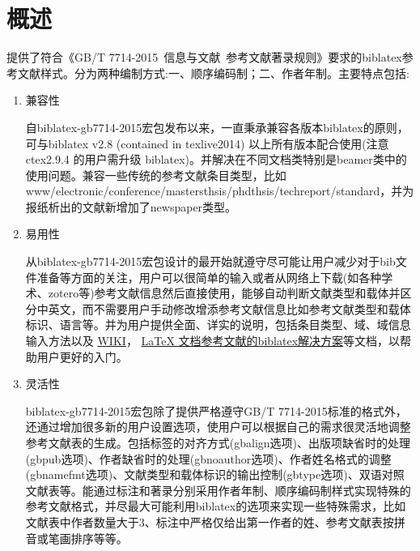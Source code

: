 
\titleandauthor
{}
\tableofcontents
\listoffigures
\listoftables
\listofegcode

\section{概述}
提供了符合《GB/T 7714-2015~信息与文献~参考文献著录规则》要求的biblatex参考文献样式。分为两种编制方式:一、顺序编码制；二、作者年制。主要特点包括:
\begin{enumerate}
  \item 兼容性

自biblatex-gb7714-2015宏包发布以来，一直秉承兼容各版本biblatex的原则，可与biblatex v2.8 (contained in texlive2014) 以上所有版本配合使用(注意 ctex2.9.4 的用户需升级 biblatex)。并解决在不同文档类特别是beamer类中的使用问题。兼容一些传统的参考文献条目类型，比如www/electronic/conference/mastersthsis/phdthsis/techreport/standard，并为报纸析出的文献新增加了newspaper类型。

  \item 易用性

从biblatex-gb7714-2015宏包设计的最开始就遵守尽可能让用户减少对于bib文件准备等方面的关注，用户可以很简单的输入或者从网络上下载(如各种学术、zotero等)参考文献信息然后直接使用，能够自动判断文献类型和载体并区分中英文，而不需要用户手动修改增添参考文献信息比如参考文献类型和载体标识、语言等。并为用户提供全面、详实的说明，包括条目类型、域、域信息输入方法以及
\href{https://github.com/hushidong/biblatex-gb7714-2015/wiki}{WIKI}，
\href{https://github.com/hushidong/biblatex-solution-to-latex-bibliography/blob/master/biblatex-solution-to-latex-bibliography.pdf}{LaTeX 文档参考文献的biblatex解决方案}等文档，以帮助用户更好的入门。

  \item 灵活性

biblatex-gb7714-2015宏包除了提供严格遵守GB/T 7714-2015标准的格式外，还通过增加很多新的用户设置选项，使用户可以根据自己的需求很灵活地调整参考文献表的生成。包括标签的对齐方式(gbalign选项)、出版项缺省时的处理(gbpub选项)、作者缺省时的处理(gbnoauthor选项)、作者姓名格式的调整(gbnamefmt选项)、文献类型和载体标识的输出控制(gbtype选项)、双语对照文献表等。能通过标注和著录分别采用作者年制、顺序编码制样式实现特殊的参考文献格式，并尽最大可能利用biblatex的选项来实现一些特殊需求，比如文献表中作者数量大于3、标注中严格仅给出第一作者的姓、参考文献表按拼音或笔画排序等等。
\end{enumerate}

